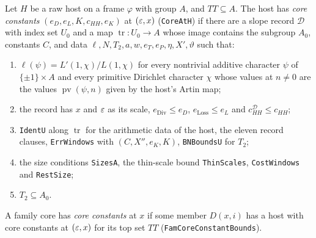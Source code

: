 \begin{definition}\label{geob:coreath}
Let $H$ be a raw host on a frame $\varphi$ with group $A$, and $TT\subseteq A$.
The host has \emph{core constants} $(e_D,e_L,K,c_{HH},e_K)$ at $(\varepsilon,x)$
(\texttt{CoreAtH}) if there are a slope record $\mathcal D$ with index set $U_0$
and a map $\operatorname{tr}\colon U_0\to A$ whose image contains the subgroup
$A_0$, constants $C$, and data $\ell,N,T_2,a,w,e_T,e_P,\eta,X',\vartheta$ such
that:
\begin{enumerate}
\item $\ell(\psi)=L'(1,\chi)/L(1,\chi)$ for every nontrivial additive character
$\psi$ of $\{\pm1\}\times A$ and every primitive Dirichlet character $\chi$
whose values at $n\ne0$ are the values $\operatorname{pv}(\psi,n)$ given by the
host's Artin map;
\item the record has $x$ and $\varepsilon$ as its scale, $e_{\mathrm{Div}}\le e_D$,
$e_{\mathrm{Loss}}\le e_L$ and $c_{HH}^{\mathcal D}\le c_{HH}$;
\item \texttt{IdentU} along $\operatorname{tr}$ for the arithmetic data of the
host, the eleven record clauses, \texttt{ErrWindows} with $(C,X'',e_K,K)$,
\texttt{BNBoundsU} for $T_2$;
\item the size conditions \texttt{SizesA}, the thin-scale bound
\texttt{ThinScales}, \texttt{CostWindows} and \texttt{RestSize};
\item $T_2\subseteq A_0$.
\end{enumerate}
A family core has \emph{core constants} at $x$ if some member $D(x,i)$ has a host
with core constants at $(\varepsilon,x)$ for its top set $TT$
(\texttt{FamCoreConstantBounds}).
\end{definition}

